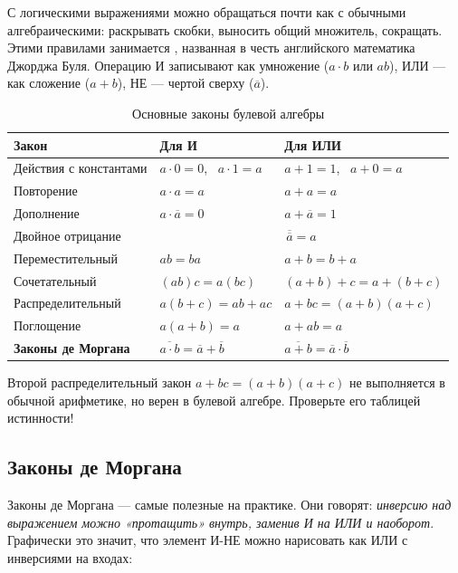 С логическими выражениями можно обращаться почти как с обычными
алгебраическими: раскрывать скобки, выносить общий множитель, сокращать.
Этими правилами занимается , названная в честь
английского математика Джорджа Буля. Операцию И записывают как умножение
($a\cdot b$ или $ab$), ИЛИ --- как сложение ($a+b$), НЕ --- чертой сверху
($\overline{a}$).

\begin{table}[H]
\centering
\caption{Основные законы булевой алгебры}
\label{tab:bool}
\begin{tabular}{l l l}
\toprule
\textbf{Закон} & \textbf{Для И} & \textbf{Для ИЛИ} \\
\midrule
Действия с константами & $a\cdot 0 = 0$, \ $a\cdot 1 = a$ & $a+1 = 1$, \ $a+0 = a$ \\
Повторение             & $a\cdot a = a$ & $a+a = a$ \\
Дополнение             & $a\cdot\overline{a} = 0$ & $a+\overline{a} = 1$ \\
Двойное отрицание      & \multicolumn{2}{c}{$\overline{\overline{a}} = a$} \\
Переместительный       & $ab = ba$ & $a+b = b+a$ \\
Сочетательный          & $(ab)c = a(bc)$ & $(a+b)+c = a+(b+c)$ \\
Распределительный      & $a(b+c) = ab+ac$ & $a+bc = (a+b)(a+c)$ \\
Поглощение             & $a(a+b) = a$ & $a+ab = a$ \\
\textbf{Законы де Моргана} & $\overline{a\cdot b} = \overline{a}+\overline{b}$ & $\overline{a+b} = \overline{a}\cdot\overline{b}$ \\
\bottomrule
\end{tabular}
\end{table}

\begin{warnbox}
Второй распределительный закон $a+bc = (a+b)(a+c)$ не выполняется в обычной
арифметике, но верен в булевой алгебре. Проверьте его таблицей истинности!
\end{warnbox}

\subsection{Законы де Моргана}

Законы де Моргана --- самые полезные на практике. Они говорят: \emph{инверсию
над выражением можно «протащить» внутрь, заменив И на ИЛИ и наоборот}.
Графически это значит, что элемент И-НЕ можно нарисовать как ИЛИ с
инверсиями на входах:

